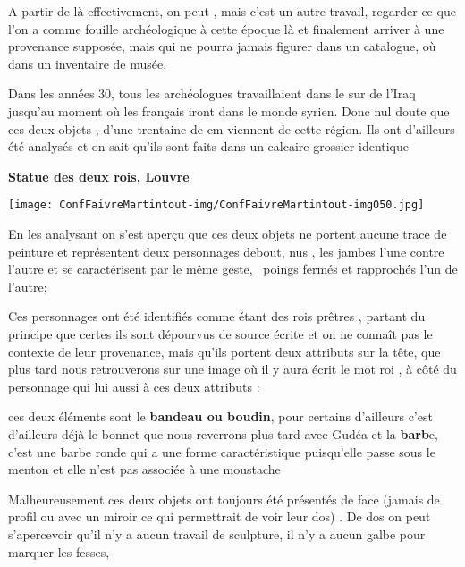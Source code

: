 \documentclass[a4paper]{article}
\begin{document}
\bigskip

{
A partir de là effectivement, on peut , mais c'est un autre travail,
regarder ce que l'on a comme fouille archéologique à cette époque là et
finalement arriver à une provenance supposée, mais qui ne pourra jamais
figurer dans un catalogue, où dans un inventaire de musée.}

{
Dans les années 30, tous les archéologues travaillaient dans le sur de
l'Iraq jusqu'au moment où les français iront dans le monde syrien. Donc
nul doute que ces deux objets , d'une trentaine de cm viennent de cette
région. Ils ont d'ailleurs été analysés et on sait qu'ils sont faits
dans un calcaire grossier identique}


\bigskip


\bigskip

{
\textbf{Statue des deux rois, Louvre}}


\bigskip


\texttt{[image: ConfFaivreMartintout-img/ConfFaivreMartintout-img050.jpg]}



\bigskip


\bigskip

{
En les analysant on s'est aperçu que ces deux objets ne portent aucune
trace de peinture et représentent deux personnages debout, nus , les
jambes l'une contre l'autre et se caractérisent par le même geste,
\ poings fermés et rapprochés l'un de l'autre; }

{
Ces personnages ont été identifiés comme étant des rois prêtres ,
partant du principe que certes ils sont dépourvus de source écrite et
on ne connaît pas le contexte de leur provenance, mais qu'ils portent
deux attributs sur la tête, que plus tard nous retrouverons sur une
image où il y aura écrit le mot roi , à côté du personnage qui lui
aussi à ces deux attributs : }

{
ces deux éléments sont le \textbf{bandeau ou boudin}, pour certains
d'ailleurs c'est d'ailleurs déjà le bonnet que nous reverrons plus tard
avec Gudéa et la \textbf{barb}e, c'est une barbe ronde qui a une forme
caractéristique puisqu'elle passe sous le menton et elle n'est pas
associée à une moustache}


\bigskip

{
Malheureusement ces deux objets ont toujours été présentés de face
(jamais de profil ou avec un miroir ce qui permettrait de voir leur
dos) . De dos on peut s'apercevoir qu'il n'y a aucun travail de
sculpture, il n'y a aucun galbe pour marquer les fesses, }
\end{document}
